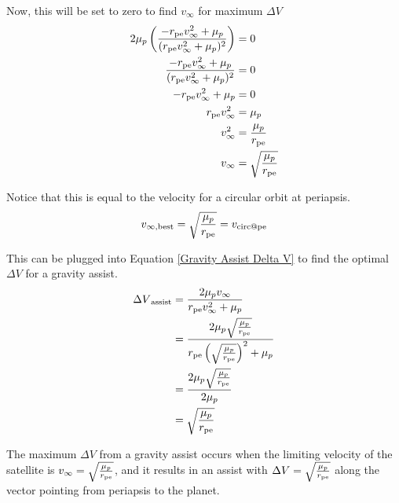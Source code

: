\documentclass[../basicOrbitalDynamics.tex]{subfiles}
\begin{document}
Now, this will be set to zero to find $v_\infty$ for maximum $\Delta V$
\begin{align*}
    2\mu_p\left(\frac{-{r}_\text{pe}v_\infty^2+\mu_p}{({r}_\text{pe}v_\infty^2+\mu_p)^2}\right) & = 0                                \\
    \frac{-{r}_\text{pe}v_\infty^2+\mu_p}{({r}_\text{pe}v_\infty^2+\mu_p)^2}                    & = 0                                \\
    -{r}_\text{pe}v_\infty^2+\mu_p                                                            & = 0                                \\
    {r}_\text{pe}v_\infty^2                                                                   & = \mu_p                            \\
    v_\infty^2                                                                              & = \frac{\mu_p}{{r}_\text{pe}}        \\
    v_\infty                                                                                & = \sqrt{\frac{\mu_p}{{r}_\text{pe}}} \\
\end{align*}

Notice that this is equal to the velocity for a circular orbit at periapsis.
\begin{equation}\label{Gravity Assist Best Vinfty}
    v_{\infty,\text{best}} = \sqrt{\frac{\mu_p}{{r}_\text{pe}}} = {v}_\text{circ@pe}
\end{equation}

This can be plugged into Equation \eqref{Gravity Assist Delta V} to find the optimal $\Delta V$ for a gravity assist.
\begin{align*}
    {\Delta V}_\text{assist} & =\frac{2\mu_p v_\infty}{{r}_\text{pe}v_\infty^2+\mu_p}                                                              \\
                           & =\frac{2\mu_p \sqrt{\frac{\mu_p}{{r}_\text{pe}}}}{{r}_\text{pe}\left(\sqrt{\frac{\mu_p}{{r}_\text{pe}}}\right)^2+\mu_p} \\
                           & =\frac{2\mu_p \sqrt{\frac{\mu_p}{{r}_\text{pe}}}}{2\mu_p}                                                           \\
                           & =\sqrt{\frac{\mu_p}{{r}_\text{pe}}}
\end{align*}

The maximum $\Delta V$ from a gravity assist occurs when the limiting velocity of the satellite is $v_\infty=\sqrt{\frac{\mu_p}{{r}_\text{pe}}}$, and it results in an assist with $\Delta V = \sqrt{\frac{\mu_p}{{r}_\text{pe}}}$ along the vector pointing from periapsis to the planet.
\end{document}
